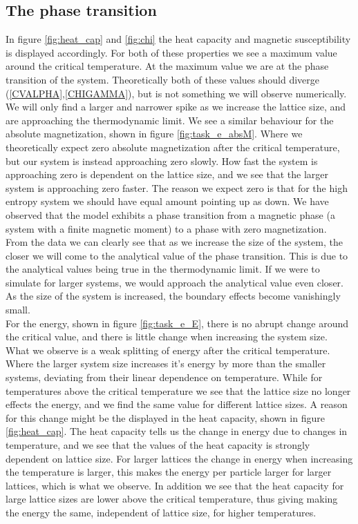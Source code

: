 \documentclass[%
 reprint,
nofootinbib,
aps,
]{revtex4-1}
\begin{document}
\subsection{The phase transition}
In figure \ref{fig:heat_cap} and \vref{fig:chi} the heat capacity and magnetic susceptibility is displayed accordingly. For both of these properties we see a maximum value around the critical temperature. At the maximum value we are at the phase transition of the system. Theoretically both of these values should diverge (\ref{CVALPHA},\ref{CHIGAMMA}), but is not something we will observe numerically. We will only find a larger and narrower spike as we increase the lattice size, and are approaching the thermodynamic limit. We see a similar behaviour for the absolute magnetization, shown in figure \vref{fig:task_e_absM}. Where we theoretically expect zero absolute magnetization after the critical temperature, but our system is instead approaching zero slowly. How fast the system is approaching zero is dependent on the lattice size, and we see that the larger system is approaching zero faster. The reason we expect zero is that for the high entropy system we should have equal amount pointing up as down. We have observed that the model exhibits a phase transition from a magnetic phase (a system with a finite magnetic moment) to a phase with zero magnetization.\\
From the data we can clearly see that as we increase the size of the system, the closer we will come to the analytical value of the phase transition. This is due to the analytical values being true in the thermodynamic limit. If we were to simulate for larger systems, we would approach the analytical value even closer. As the size of the system is increased, the boundary effects become vanishingly small.\\
For the energy, shown in figure \vref{fig:task_e_E}, there is no abrupt change around the critical value, and there is little change when increasing the system size. What we observe is a weak splitting of energy after the critical temperature. Where the larger system size increases it's energy by more than the smaller systems, deviating from their linear dependence on temperature. While for temperatures above the critical temperature we see that the lattice size no longer effects the energy, and we find the same value for different lattice sizes. A reason for this change might be the displayed in the heat capacity, shown in figure \vref{fig:heat_cap}. The heat capacity tells us the change in energy due to changes in temperature, and we see that the values of the heat capacity is strongly dependent on lattice size. For larger lattices the change in energy when increasing the temperature is larger, this makes the energy per particle larger for larger lattices, which is what we observe. In addition we see that the heat capacity for large lattice sizes are lower above the critical temperature, thus giving making the energy the same, independent of lattice size, for higher temperatures.\\
\end{document}
